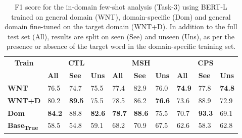 \documentclass[11pt,a4paper]{article}
\begin{document}
\begin{table}[]
\setlength{\tabcolsep}{3.3pt}
\resizebox{\columnwidth}{!}
{
\begin{tabular}{llllllllll}
\toprule
\multicolumn{1}{c}{\multirow{2}{*}{\textbf{Train}}} & \multicolumn{3}{c}{\textbf{CTL}}        & \multicolumn{3}{c}{\textbf{MSH}}           & \multicolumn{3}{c}{\textbf{CPS}}  \\ \cmidrule(lr){2-4} \cmidrule(lr){5-7} \cmidrule(lr){8-10}
\multicolumn{1}{c}{}                                   & \textbf{All} & \textbf{See} & \textbf{Uns} & \textbf{All} & \textbf{See} & \textbf{Uns} & \textbf{All} & \textbf{See} & \textbf{Uns} \\ \midrule
\textbf{WNT}                                        & 76.5         & 74.7          & 75.5            & 77.4         & 82.9          & 76.0              & \textbf{74.9}         & 77.8          & \textbf{74.8}            \\ 
\textbf{WNT+D}                       & 80.2         & \textbf{89.5}          & 75.5            & 78.5         & 86.2          & \textbf{76.6}            & 73.6         & 88.9          & 72.9            \\
\textbf{Dom}                            & \textbf{84.2}         & 88.8          & \textbf{82.6}            & \textbf{78.7}         & \textbf{88.6}          & 75.5            & 70.7         & \textbf{93.3}          & 69.1            \\ 
\midrule
\textbf{Base\textsubscript{True}}                                   & 58.5         & 54.8          & 59.1            & 68.2         & 70.9          & 67.5            & 62.6         & 58.3          & 62.8            \\ 
\bottomrule
\end{tabular}
}
\caption{\label{tab:results_in_domain_f1}
F1 score for the in-domain few-shot analysis (Task-3) using BERT-L trained on general domain (WNT), domain-specific (Dom) and general domain fine-tuned on the target domain (WNT+D). 
In addition to 
the full test set (All), 
results are split on seen (See) and unseen (Uns), as per the presence or absence of the target word in the domain-specific training set.
}
\end{table}
\end{document}
